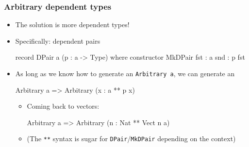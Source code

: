 \documentclass[compress,handout]{beamer}
\begin{document}
\begin{frame}[fragile]
  \frametitle{Arbitrary dependent types}
  
  \begin{itemize}
    \item The solution is more dependent types!
    \item Specifically: dependent pairs

    \vspace*{-6mm}
    \begin{idrislisting}
record DPair a (p : a -> Type) where
  constructor MkDPair
  fst : a
  snd : p fst
    \end{idrislisting}
    \vspace*{-3mm}

    \item As long as we know how to generate an \texttt{Arbitrary a}, we can
          generate an
    \vspace*{-6mm}
    \begin{idrislisting}
Arbitrary a => Arbitrary (x : a ** p x)
    \end{idrislisting}
    \vspace*{-2mm}

    \begin{itemize}
      \item Coming back to vectors:
      \vspace*{-6mm}
      \begin{idrislisting}
Arbitrary a => Arbitrary (n : Nat ** Vect n a)
      \end{idrislisting}
    \vspace*{-2mm}

      \item (The \texttt{**} syntax is sugar for \texttt{DPair}/\texttt{MkDPair}
            depending on the context)
    \end{itemize}
  \end{itemize}

\end{frame}
\end{document}
